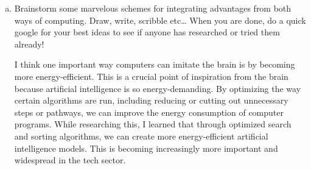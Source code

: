 \documentclass[letterpaper,11pt]{article}
\begin{document}
\begin{enumerate}[a)]
\item Brainstorm some marvelous schemes for integrating advantages from both ways of computing. Draw, write, scribble etc… When you are done, do a quick google for your best ideas to see if anyone has researched or tried them already!

\begin{tcolorbox}
I think one important way computers can imitate the brain is by becoming more energy-efficient. This is a crucial point of inspiration from the brain because artificial intelligence is so energy-demanding. By optimizing the way certain algorithms are run, including reducing or cutting out unnecessary steps or pathways, we can improve the energy consumption of computer programs. While researching this, I learned that through optimized search and sorting algorithms, we can create more energy-efficient artificial intelligence models. This is becoming increasingly more important and widespread in the tech sector. 
\end{tcolorbox}
    
\end{enumerate}
\end{document}
